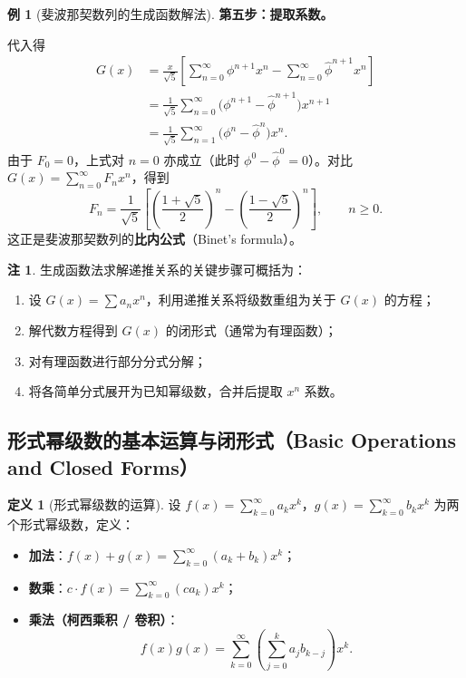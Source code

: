 \documentclass[UTF8,11pt,a4paper]{ctexbook}   %
\theoremstyle{definition}
\newtheorem{definition}{定义}[section]
\newtheorem{example}{例}[section]
\newtheorem{remark}{注}[section]
\begin{document}
\begin{example}[斐波那契数列的生成函数解法]
\textbf{第五步：提取系数。}

代入得
\begin{align*}
G(x) &= \frac{x}{\sqrt{5}}\left[\sum_{n=0}^{\infty}\phi^{n+1}x^n - \sum_{n=0}^{\infty}\hat{\phi}^{n+1}x^n\right] \\
&= \frac{1}{\sqrt{5}}\sum_{n=0}^{\infty}\bigl(\phi^{n+1}-\hat{\phi}^{n+1}\bigr)x^{n+1} \\
&= \frac{1}{\sqrt{5}}\sum_{n=1}^{\infty}\bigl(\phi^{n}-\hat{\phi}^{n}\bigr)x^{n}.
\end{align*}
由于 $F_0=0$，上式对 $n=0$ 亦成立（此时 $\phi^0-\hat{\phi}^0=0$）。对比 $G(x)=\sum_{n=0}^{\infty}F_n x^n$，得到
\[
\boxed{F_n = \frac{1}{\sqrt{5}}\left[\left(\frac{1+\sqrt{5}}{2}\right)^n - \left(\frac{1-\sqrt{5}}{2}\right)^n\right]},\qquad n\ge 0.
\]
这正是斐波那契数列的\textbf{比内公式}（Binet's formula）。
\end{example}

\begin{remark}
生成函数法求解递推关系的关键步骤可概括为：
\begin{enumerate}
    \item 设 $G(x)=\sum a_n x^n$，利用递推关系将级数重组为关于 $G(x)$ 的方程；
    \item 解代数方程得到 $G(x)$ 的闭形式（通常为有理函数）；
    \item 对有理函数进行部分分式分解；
    \item 将各简单分式展开为已知幂级数，合并后提取 $x^n$ 系数。
\end{enumerate}
\end{remark}

\subsection{形式幂级数的基本运算与闭形式（Basic Operations and Closed Forms）}

\begin{definition}[形式幂级数的运算]
设 $f(x)=\sum_{k=0}^{\infty}a_k x^k$，$g(x)=\sum_{k=0}^{\infty}b_k x^k$ 为两个形式幂级数，定义：
\begin{itemize}
    \item \textbf{加法}：$f(x)+g(x)=\sum_{k=0}^{\infty}(a_k+b_k)x^k$；
    \item \textbf{数乘}：$c\cdot f(x)=\sum_{k=0}^{\infty}(c a_k)x^k$；
    \item \textbf{乘法（柯西乘积 / 卷积）}：
    \[
    f(x)g(x)=\sum_{k=0}^{\infty}\left(\sum_{j=0}^{k}a_j b_{k-j}\right)x^k.
    \]
\end{itemize}
\end{definition}
\end{document}
